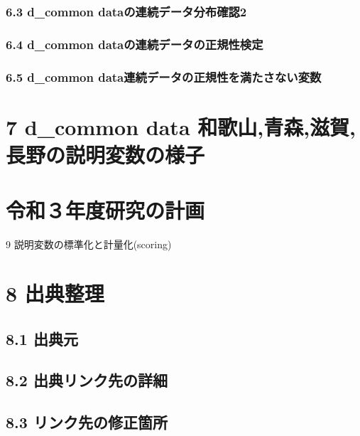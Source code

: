 \subsection{6.3 d\_common dataの連続データ分布確認2}

\subsection{6.4 d\_common dataの連続データの正規性検定}

\subsection{6.5 d\_common data連続データの正規性を満たさない変数}


\chapter{7 d\_common data 和歌山,青森,滋賀,長野の説明変数の様子}







\chapter{令和３年度研究の計画}

9 説明変数の標準化と計量化(scoring)





\chapter{8 出典整理}

\section{8.1 出典元}


\section{8.2 出典リンク先の詳細}



\section{8.3 リンク先の修正箇所}








